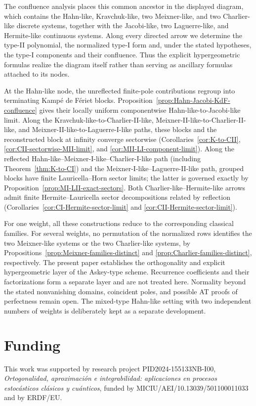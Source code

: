 \documentclass[10pt]{amsart}
\theoremstyle{plain}
\theoremstyle{definition}
\theoremstyle{remark}
\begin{document}
The confluence analysis places this common ancestor in the displayed
diagram, which contains the Hahn-like, Kravchuk-like, two Meixner-like,
and two Charlier-like discrete systems, together with the Jacobi-like, two
Laguerre-like, and Hermite-like continuous systems. Along every directed
arrow we determine the type-II polynomial, the normalized type-I form
and, under the stated hypotheses, the type-I components and their
confluence. Thus the explicit
hypergeometric formulas realize the diagram itself rather than serving as
ancillary formulas attached to its nodes.

At the Hahn-like node, the unreflected finite-pole contributions regroup
into terminating Kamp\'e de F\'eriet blocks.
Proposition~\ref{prop:Hahn-Jacobi-KdF-confluence} gives their locally
uniform componentwise Hahn-like-to-Jacobi-like limit. Along the
Kravchuk-like-to-Charlier-II-like,
Meixner-II-like-to-Charlier-II-like, and
Meixner-II-like-to-Laguerre-I-like paths, these blocks and the
reconstructed block at infinity converge sectorwise
(Corollaries~\ref{cor:K-to-CII}, \ref{cor:CII-sectorwise-MII-limit}, and
\ref{cor:MII-LI-component-limit}). Along the
reflected Hahn-like--Meixner-I-like--Charlier-I-like path
(including Theorem~\ref{thm:K-to-CI}) and the
Meixner-I-like--Laguerre-II-like path, grouped blocks have finite
Lauricella--Horn sector limits; the latter is governed exactly by
Proposition~\ref{prop:MI-LII-exact-sectors}. Both
Charlier-like--Hermite-like arrows admit finite Hermite--Lauricella sector
decompositions related by reflection
(Corollaries~\ref{cor:CI-Hermite-sector-limit} and
\ref{cor:CII-Hermite-sector-limit}).

For one weight, all these constructions reduce to the corresponding
classical families. For several weights, no permutation of the normalized
rows identifies the two Meixner-like systems or the two Charlier-like
systems, by Propositions~\ref{prop:Meixner-families-distinct} and
\ref{prop:Charlier-families-distinct}, respectively. The present paper
establishes the orthogonality and explicit hypergeometric layer of the
Askey-type scheme. Recurrence coefficients and their factorizations form
a separate layer and are not treated here. Normality beyond the stated
nonvanishing domains, coincident poles, and possible AT proofs of
perfectness remain open. The mixed-type Hahn-like setting with two
independent numbers of weights is deliberately kept as a separate
development.

\section*{Funding}

This work was supported by research project PID2024-155133NB-I00,
\emph{Ortogonalidad, aproximaci\'on e integrabilidad: aplicaciones en procesos
	estoc\'asticos cl\'asicos y cu\'anticos}, funded by
MICIU/AEI/10.13039/501100011033 and by ERDF/EU.

\renewcommand*{\bibfont}{\small}
\enlargethispage{2\baselineskip}
\printbibliography
\end{document}
